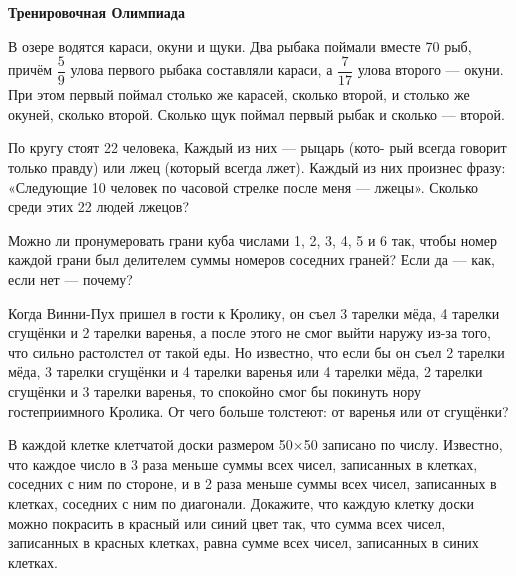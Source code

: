 \hspace{3mm}

\centerline{\bf \Huge Тренировочная Олимпиада}

\hspace{3mm}

 В озере водятся караси, окуни и щуки. Два рыбака поймали вместе 70 рыб, причём $\dfrac{5}{9}$ улова первого рыбака составляли караси, а $\dfrac{7}{17}$ улова второго — окуни. При этом первый поймал столько же карасей, сколько второй, и столько же окуней, сколько второй. Сколько щук поймал первый рыбак и сколько — второй.

\hspace{3mm}

 По кругу стоят 22 человека, Каждый из них — рыцарь (кото- рый всегда говорит только правду) или лжец (который всегда лжет). Каждый из них произнес фразу: «Следующие 10 человек по часовой стрелке после меня — лжецы». Сколько среди этих 22 людей лжецов?

\hspace{3mm}

 Можно ли пронумеровать грани куба числами 1, 2, 3, 4, 5 и 6 так, чтобы номер каждой грани был делителем суммы номеров соседних граней? Если да — как, если нет — почему?

\hspace{3mm}

 Когда Винни-Пух пришел в гости к Кролику, он съел 3 тарелки мёда, 4 тарелки сгущёнки и 2 тарелки варенья, а после этого не смог выйти наружу из-за того, что сильно растолстел от такой еды. Но известно, что если бы он съел 2 тарелки мёда, 3 тарелки сгущёнки и 4 тарелки варенья или 4 тарелки мёда, 2 тарелки сгущёнки и 3 тарелки варенья, то спокойно смог бы покинуть нору гостеприимного Кролика. От чего больше толстеют: от варенья или от сгущёнки?

\hspace{3mm}

 В каждой клетке клетчатой доски размером 50×50 записано по числу. Известно, что каждое число в 3 раза меньше суммы всех чисел, записанных в клетках, соседних с ним по стороне, и в 2 раза меньше суммы всех чисел, записанных в клетках, соседних с ним по диагонали. Докажите, что каждую клетку доски можно покрасить в красный или синий цвет так, что сумма всех чисел, записанных в красных клетках, равна сумме всех чисел, записанных в синих клетках.